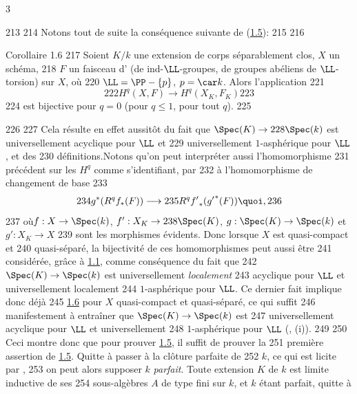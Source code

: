 3	\documentclass[10pt]{../fichiers-configuration-latex/smfart}
\begin{document}
   213	
   214	Notons tout de suite la conséquence suivante de (\hyperref[XVI.cor1.5]{1.5}):
   215	
   216	\begin{enonce*}{Corollaire 1.6}
   217	Soient $K/k$ une extension de corps séparablement clos, $X$ un schéma,
   218	$F$ un faisceau d' (\resp de ind-$\LL$-groupes, 	de groupes abéliens de $\LL$-torsion) sur $X$, où
   220	$\LL=\PP-\{p\}$, $p=\car k$. Alors l'application
   221	$$
   222	H^{q}(X,F)\longrightarrow H^{q}(X_{K},F_{K})
   223	$$
   224	est bijective pour $q=0$ (\resp pour $q\leq 1$, \resp pour tout $q$).
   225	\end{enonce*}
   226	
   227	Cela résulte en effet aussitôt du fait que $\Spec(K)\rightarrow
   228	\Spec(k)$ est universellement acyclique pour $\LL$ et
   229	universellement $1$-asphérique pour $\LL$, et des
   230	définitions.\sisi{---~}{~}Notons qu'on peut interpréter aussi l'homomorphisme
   231	précédent sur les $H^{q}$ comme s'identifiant, par \sisi{}{,}
   232	à l'homomorphisme de changement de base
   233	$$
   234	g^{\ast}(R^{q}f_{\ast}(F))\longrightarrow
   235	R^{q}{f'}_{\ast}({g'}^{\ast}(F)){\quoi},
   236	$$
   237	où\pageoriginale $f:X\rightarrow \Spec(k)$, $f':X_K\rightarrow
   238	\Spec(K)$, $g:\Spec(K)\rightarrow \Spec(k)$ et $g':X_K\rightarrow X$
   239	sont les morphismes évidents. Donc lorsque $X$ est quasi-compact et
   240	quasi-séparé, la bijectivité de ces homomorphismes peut aussi être
   241	considérée, grâce à \hyperref[XVI.thm1.1]{1.1}, comme conséquence du fait que
   242	$\Spec(K)\rightarrow \Spec(k)$ est universellement \emph{localement}
   243	acyclique pour $\LL$ et universellement localement
   244	$1$-asphérique pour $\LL$. Ce dernier fait implique donc déjà
   245	\hyperref[XVI.cor1.6]{1.6} pour $X$ quasi-compact et quasi-séparé, ce qui suffit
   246	manifestement à entraîner que $\Spec (K)\rightarrow \Spec(k)$ est
   247	universellement acyclique pour $\LL$ et universellement
   248	$1$-asphérique pour $\LL$ (,  (i)).
   249	
   250	Ceci montre donc que pour prouver \hyperref[XVI.cor1.5]{1.5}, il suffit de prouver la
   251	première assertion de \hyperref[XVI.cor1.5]{1.5}. Quitte à passer à la clôture parfaite de
   252	$k$, ce qui est licite par ,
   253	on peut alors supposer $k$ \emph{parfait}. Toute extension $K$ de $k$ est limite inductive de ses
   254	sous-algèbres $A$ de type fini sur $k$, et $k$ étant parfait, quitte à
\end{document}
